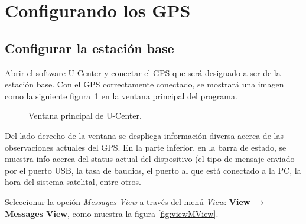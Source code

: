 \section{Configurando los GPS}\label{sec:Config}

\subsection{Configurar la estación base}\label{SubChap:ConfBase}

Abrir el software U-Center y conectar el GPS que será designado a ser de la estación base. Con el GPS correctamente conectado, se mostrará una imagen como la siguiente figura~\ref{fig:mainWind} en la ventana principal del programa.

\begin{figure}[H] %
\caption{Ventana principal de U-Center.}
\label{fig:mainWind}
\end{figure}

Del lado derecho de la ventana se despliega información diversa acerca de las observaciones actuales del GPS. En la parte inferior, en la barra de estado, se muestra info acerca del status actual del dispositivo (el tipo de mensaje enviado por el puerto USB, la tasa de baudios, el puerto al que está conectado a la PC, la hora del sistema satelital, entre otros.

Seleccionar la opción \textit{Messages View} a través del menú \textit{View}: \textbf{View $\rightarrow$ Messages View}, como muestra la figura \ref{fig:viewMView}. 

